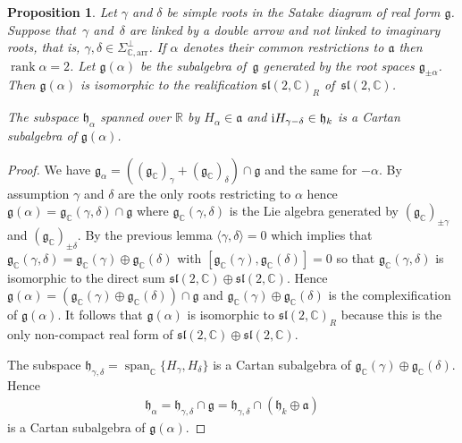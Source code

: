 \documentclass[10pt,a4paper]{amsart}
\numberwithin{equation}{section}
\newtheorem{Proposition}[Theorem]{Proposition}
 { \theoremstyle{definition}
\newtheorem{Definition}[Theorem]{Definition}
\newtheorem{Note}[Theorem]{Note}
\newtheorem{Example}[Theorem]{Example}
\newtheorem{Remark}[Theorem]{Remark} }
\begin{document}
\begin{Proposition}\label{propEsseeleC}Let $\gamma $ and $\delta $ be simple roots in the Satake diagram of real form $\mathfrak{g}$. Suppose that~$\gamma $ and~$\delta $ are linked by a double arrow and not linked to imaginary roots, that is, $\gamma,\delta \in \Sigma _{\mathbb{C},\mathrm{arr}}^{\bot }$. If $\alpha $ denotes their common restrictions to $\mathfrak{a}$ then $\operatorname{rank} \alpha =2$. Let $\mathfrak{g} (\alpha) $ be the subalgebra of~$\mathfrak{g}$ generated by the root spaces $\mathfrak{g}_{\pm \alpha }$. Then $\mathfrak{g}(\alpha) $ is isomorphic to the realification $\mathfrak{sl}(2,\mathbb{C}) _{R}$ of~$\mathfrak{sl}(2,\mathbb{C}) $.

The subspace $\mathfrak{h}_{\alpha }$ spanned over $\mathbb{R}$ by $H_{\alpha }\in \mathfrak{a}$ and ${\rm i}H_{\gamma -\delta }\in \mathfrak{h}_{k}$ is a Cartan subalgebra of $\mathfrak{g}(\alpha) $.
\end{Proposition}

\begin{proof}We have $\mathfrak{g}_{\alpha }=( ( \mathfrak{g}_{\mathbb{C}}) _{\gamma }+( \mathfrak{g}_{\mathbb{C}}) _{\delta}) \cap \mathfrak{g}$ and the same for $-\alpha $. By assumption $\gamma $ and $\delta $ are the only roots restricting to $\alpha $ hence $\mathfrak{g}(\alpha) =\mathfrak{g}_{\mathbb{C}}( \gamma,\delta ) \cap \mathfrak{g}$ where $\mathfrak{g}_{\mathbb{C}}(\gamma,\delta) $ is the Lie algebra generated by $( \mathfrak{g}_{\mathbb{C}}) _{\pm \gamma }$ and $( \mathfrak{g}_{\mathbb{C}}) _{\pm \delta }$. By the previous lemma $\langle \gamma,\delta\rangle =0$ which implies that $\mathfrak{g}_{\mathbb{C}}( \gamma,\delta ) =\mathfrak{g}_{\mathbb{C}}(\gamma) \oplus\mathfrak{g}_{\mathbb{C}}(\delta) $ with $[\mathfrak{g}_{\mathbb{C}}(\gamma),\mathfrak{g}_{\mathbb{C}}( \delta) ]=0$ so that $\mathfrak{g}_{\mathbb{C}}( \gamma,\delta)
$ is isomorphic to the direct sum $\mathfrak{sl}( 2,\mathbb{C}) \oplus \mathfrak{sl}( 2,\mathbb{C}) $. Hence $\mathfrak{g}(\alpha) =( \mathfrak{g}_{\mathbb{C}}(\gamma)\oplus \mathfrak{g}_{\mathbb{C}}(\delta) ) \cap \mathfrak{g}$ and $\mathfrak{g}_{\mathbb{C}}(\gamma) \oplus \mathfrak{g}_{\mathbb{C}}(\delta) $ is the complexification of $\mathfrak{g}(\alpha) $. It follows that $\mathfrak{g}(\alpha) $ is isomorphic to $\mathfrak{sl}( 2,\mathbb{C}) _{R}$ because this is the only non-compact real form of $\mathfrak{sl} ( 2,\mathbb{C} ) \oplus \mathfrak{sl}(2,\mathbb{C}) $.

The subspace $\mathfrak{h}_{\gamma,\delta }=\operatorname{span}_{\mathbb{C}}\{H_{\gamma },H_{\delta }\}$ is a Cartan subalgebra of $\mathfrak{g}_{\mathbb{C}}(\gamma) \oplus \mathfrak{g}_{\mathbb{C}}(\delta) $. Hence
\begin{gather*}
\mathfrak{h}_{\alpha }=\mathfrak{h}_{\gamma,\delta }\cap \mathfrak{g}=\mathfrak{h}_{\gamma,\delta }\cap ( \mathfrak{h}_{k}\oplus \mathfrak{a})
\end{gather*}
is a Cartan subalgebra of $\mathfrak{g}(\alpha) $.
\end{proof}
\end{document}
